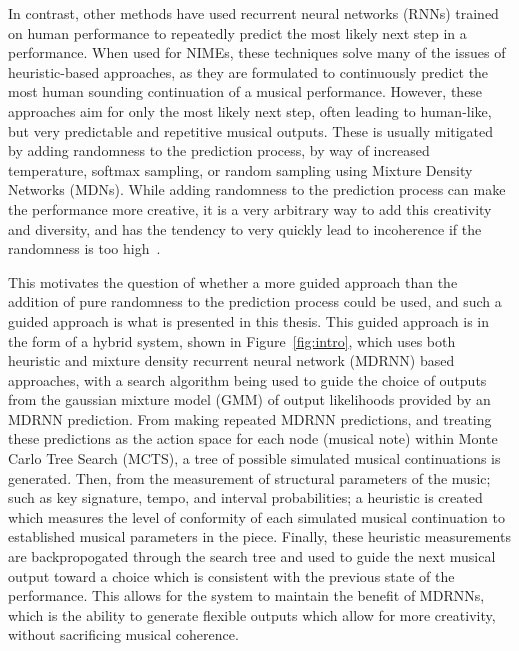 In contrast, other methods have used recurrent neural networks (RNNs) trained on human performance to repeatedly predict the most likely next step in a performance. When used for NIMEs, these techniques solve many of the issues of heuristic-based approaches, as they are formulated to continuously predict the most human sounding continuation of a musical performance. However, these approaches aim for only the most likely next step, often leading to human-like, but very predictable and repetitive musical outputs. These is usually mitigated by adding randomness to the prediction process, by way of increased temperature, softmax sampling, or random sampling using Mixture Density Networks (MDNs). While adding randomness to the prediction process can make the performance more creative, it is a very arbitrary way to add this creativity and diversity, and has the tendency to very quickly lead to incoherence if the randomness is too high~\citep{Martin2018RoboJam,Martin2019IMPSY}.

This motivates the question of whether a more guided approach than the addition of pure randomness to the prediction process could be used, and such a guided approach is what is presented in this thesis. This guided approach is in the form of a hybrid system, shown in Figure~\ref{fig:intro}, which uses both heuristic and mixture density recurrent neural network (MDRNN) based approaches, with a search algorithm being used to guide the choice of outputs from the gaussian mixture model (GMM) of output likelihoods provided by an MDRNN prediction. From making repeated MDRNN predictions, and treating these predictions as the action space for each node (musical note) within Monte Carlo Tree Search (MCTS), a tree of possible simulated musical continuations is generated. Then, from the measurement of structural parameters of the music; such as key signature, tempo, and interval probabilities; a heuristic is created which measures the level of conformity of each simulated musical continuation to established musical parameters in the piece. Finally, these heuristic measurements are backpropogated through the search tree and used to guide the next musical output toward a choice which is consistent with the previous state of the performance. This allows for the system to maintain the benefit of MDRNNs, which is the ability to generate flexible outputs which allow for more creativity, without sacrificing musical coherence.

